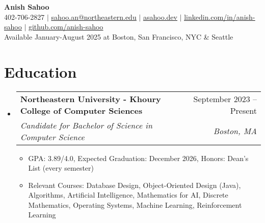 \documentclass[letterpaper,11pt]{article}
\makeatletter
\newcommand{\resumeItem}[1]{
  \item\small{
    {#1 \vspace{-2pt}}
  }
}
\newcommand{\resumeSubheading}[4]{
  \vspace{-2pt}\item
    \begin{tabular*}{0.97\textwidth}[t]{l@{\extracolsep{\fill}}r}
      \textbf{#1} & #2 \\
      \textit{\small#3} & \textit{\small #4} \\
    \end{tabular*}\vspace{-7pt}
}
\newcommand{\resumeSubHeadingListStart}{\begin{itemize}[leftmargin=0.15in, label={}]}
\newcommand{\resumeSubHeadingListEnd}{\end{itemize}}
\newcommand{\resumeItemListStart}{\begin{itemize}}
\newcommand{\resumeItemListEnd}{\end{itemize}\vspace{-5pt}}
\makeatother
\begin{document}

\begin{center}
    \textbf{\Huge Anish Sahoo} \\ \vspace{1pt}
    \small 402-706-2827 
    $|$ 
    \href{mailto:sahoo.an@northeastern.edu}{\underline{sahoo.an@northeastern.edu}} $|$ 
    \href{https://asahoo.dev}{\underline{asahoo.dev}}
    $|$
    \href{https://linkedin.com/in/anish-sahoo}{\underline{linkedin.com/in/anish-sahoo}} $|$
    \href{https://github.com/anish-sahoo}{\underline{github.com/anish-sahoo}} \vspace{1pt} \\
    Available January-August 2025 at Boston, San Francisco, NYC \& Seattle
\end{center}


\section{Education}
  \resumeSubHeadingListStart
    \resumeSubheading
      {Northeastern University - Khoury College of Computer Sciences}{September 2023 -- Present}
      {Candidate for Bachelor of Science in Computer Science}{Boston, MA}
    \resumeItemListStart
        \resumeItem{GPA: 3.89/4.0, Expected Graduation: December 2026, Honors: Dean's List (every semester)}
        \resumeItem{Relevant Courses: Database Design, Object-Oriented Design (Java), Algorithms, Artificial Intelligence, Mathematics for AI, Discrete Mathematics, Operating Systems, Machine Learning, Reinforcement Learning}
    \resumeItemListEnd
  \resumeSubHeadingListEnd



\end{document}
